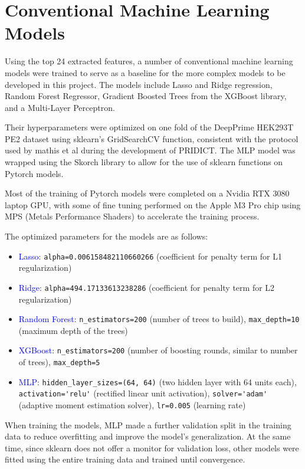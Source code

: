 \section{Conventional Machine Learning Models}
\label{sec:conventional-ml}

Using the top 24 extracted features, a number of conventional machine learning models were trained to serve as a baseline for the more complex models to be developed in this project. The models include Lasso and Ridge regression, Random Forest Regressor, Gradient Boosted Trees from the XGBoost library, and a Multi-Layer Perceptron.

Their hyperparameters were optimized on one fold of the DeepPrime HEK293T PE2 dataset using sklearn's GridSearchCV function, consistent with the protocol used by mathis et al during the development of PRIDICT. The MLP model was wrapped using the Skorch library to allow for the use of sklearn functions on Pytorch models. 

Most of the training of Pytorch models were completed on a Nvidia RTX 3080 laptop GPU, with some of fine tuning performed on the Apple M3 Pro chip using MPS (Metals Performance Shaders) to accelerate the training process.

The optimized parameters for the models are as follows:

\begin{itemize}[itemsep=-0mm]
    \item \textcolor{blue}{Lasso}: \verb|alpha=0.006158482110660266| (coefficient for penalty term for L1 regularization)
    \item \textcolor{blue}{Ridge}: \verb|alpha=494.17133613238286| (coefficient for penalty term for L2 regularization)
    \item \textcolor{blue}{Random Forest}: \verb|n_estimators=200| (number of trees to build), \verb|max_depth=10| (maximum depth of the trees)
    \item \textcolor{blue}{XGBoost}: \verb|n_estimators=200| (number of boosting rounds, similar to number of trees), \verb|max_depth=5| 
    \item \textcolor{blue}{MLP}: \verb|hidden_layer_sizes=(64, 64)| (two hidden layer with 64 units each), \verb|activation='relu'| (rectified linear unit activation), \verb|solver='adam'| (adaptive moment estimation solver), \verb|lr=0.005| (learning rate)
\end{itemize}

When training the models, MLP made a further validation split in the training data to reduce overfitting and improve the model's generalization. At the same time, since sklearn does not offer a monitor for validation loss, other models were fitted using the entire training data and trained until convergence.

